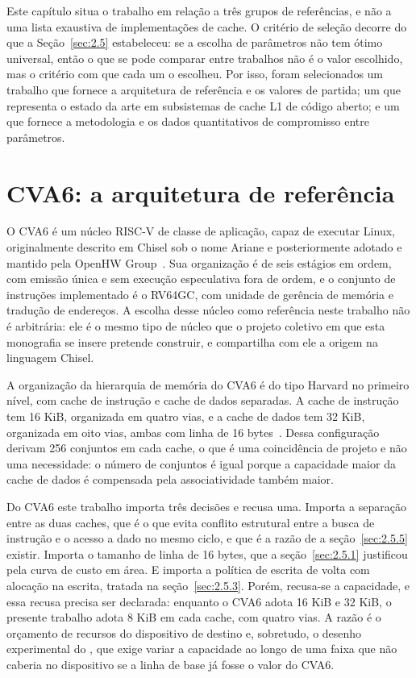 Este capítulo situa o trabalho em relação a três grupos de referências, e não a uma lista exaustiva de implementações de cache. O critério de seleção decorre do que a Seção~\ref{sec:2.5} estabeleceu: se a escolha de parâmetros não tem ótimo universal, então o que se pode comparar entre trabalhos não é o valor escolhido, mas o critério com que cada um o escolheu. Por isso, foram selecionados um trabalho que fornece a arquitetura de referência e os valores de partida; um que representa o estado da arte em subsistemas de cache L1 de código aberto; e um que fornece a metodologia e os dados quantitativos de compromisso entre parâmetros.

\section{CVA6: a arquitetura de referência}\label{sec:3.1}

O CVA6 é um núcleo RISC-V de classe de aplicação, capaz de executar Linux, originalmente descrito em Chisel sob o nome Ariane e posteriormente adotado e mantido pela OpenHW Group~\cite{zaruba2019cost}. Sua organização é de seis estágios em ordem, com emissão única e sem execução especulativa fora de ordem, e o conjunto de instruções implementado é o RV64GC, com unidade de gerência de memória e tradução de endereços. A escolha desse núcleo como referência neste trabalho não é arbitrária: ele é o mesmo tipo de núcleo que o projeto coletivo em que esta monografia se insere pretende construir, e compartilha com ele a origem na linguagem Chisel.

A organização da hierarquia de memória do CVA6 é do tipo Harvard no primeiro nível, com cache de instrução e cache de dados separadas. A cache de instrução tem 16 KiB, organizada em quatro vias, e a cache de dados tem 32 KiB, organizada em oito vias, ambas com linha de 16 bytes~\cite{zaruba2019cost}. Dessa configuração derivam 256 conjuntos em cada cache, o que é uma coincidência de projeto e não uma necessidade: o número de conjuntos é igual porque a capacidade maior da cache de dados é compensada pela associatividade também maior.

Do CVA6 este trabalho importa três decisões e recusa uma. Importa a separação entre as duas caches, que é o que evita conflito estrutural entre a busca de instrução e o acesso a dado no mesmo ciclo, e que é a razão de a seção~\ref{sec:2.5.5} existir. Importa o tamanho de linha de 16 bytes, que a seção~\ref{sec:2.5.1} justificou pela curva de custo em área. E importa a política de escrita de volta com alocação na escrita, tratada na seção~\ref{sec:2.5.3}. Porém, recusa-se a capacidade, e essa recusa precisa ser declarada: enquanto o CVA6 adota 16 KiB e 32 KiB, o presente trabalho adota 8 KiB em cada cache, com quatro vias. A razão é o orçamento de recursos do dispositivo de destino e, sobretudo, o desenho experimental do , que exige variar a capacidade ao longo de uma faixa que não caberia no dispositivo se a linha de base já fosse o valor do CVA6.

